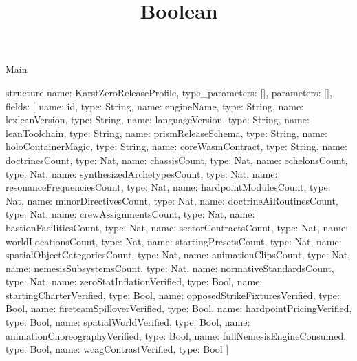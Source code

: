 \begin{lexlean}{Main}
\title{Boolean}
\begin{semanticmodule}
structure{
  name: KarstZeroReleaseProfile,
  type_parameters: [],
  parameters: [],
  fields: [
    {name: id, type: String},
    {name: engineName, type: String},
    {name: lexleanVersion, type: String},
    {name: languageVersion, type: String},
    {name: leanToolchain, type: String},
    {name: prismReleaseSchema, type: String},
    {name: holoContainerMagic, type: String},
    {name: coreWasmContract, type: String},
    {name: doctrinesCount, type: Nat},
    {name: chassisCount, type: Nat},
    {name: echelonsCount, type: Nat},
    {name: synthesizedArchetypesCount, type: Nat},
    {name: resonanceFrequenciesCount, type: Nat},
    {name: hardpointModulesCount, type: Nat},
    {name: minorDirectivesCount, type: Nat},
    {name: doctrineAiRoutinesCount, type: Nat},
    {name: crewAssignmentsCount, type: Nat},
    {name: bastionFacilitiesCount, type: Nat},
    {name: sectorContractsCount, type: Nat},
    {name: worldLocationsCount, type: Nat},
    {name: startingPresetsCount, type: Nat},
    {name: spatialObjectCategoriesCount, type: Nat},
    {name: animationClipsCount, type: Nat},
    {name: nemesisSubsystemsCount, type: Nat},
    {name: normativeStandardsCount, type: Nat},
    {name: zeroStatInflationVerified, type: Bool},
    {name: startingCharterVerified, type: Bool},
    {name: opposedStrikeFixturesVerified, type: Bool},
    {name: fireteamSpilloverVerified, type: Bool},
    {name: hardpointPricingVerified, type: Bool},
    {name: spatialWorldVerified, type: Bool},
    {name: animationChoreographyVerified, type: Bool},
    {name: fullNemesisEngineConsumed, type: Bool},
    {name: wcagContrastVerified, type: Bool}
  ]
}


\end{semanticmodule}
\end{lexlean}
